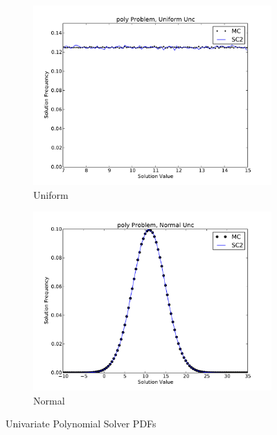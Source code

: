 \begin{figure}[H]
\centering
  \begin{subfigure}[b]{0.4\textwidth}
   \includegraphics[width=\textwidth]{../graphics/poly_uniform_pdfs}
   \caption{Uniform}
      \label{fig:poly uni}
  \end{subfigure}
  \begin{subfigure}[b]{0.4\textwidth}
   \includegraphics[width=\textwidth]{../graphics/poly_normal_pdfs}
   \caption{Normal}
      \label{fig:poly norm}
  \end{subfigure}
  \caption{Univariate Polynomial Solver PDFs}
  \label{fig:poly uni res}
\end{figure}

